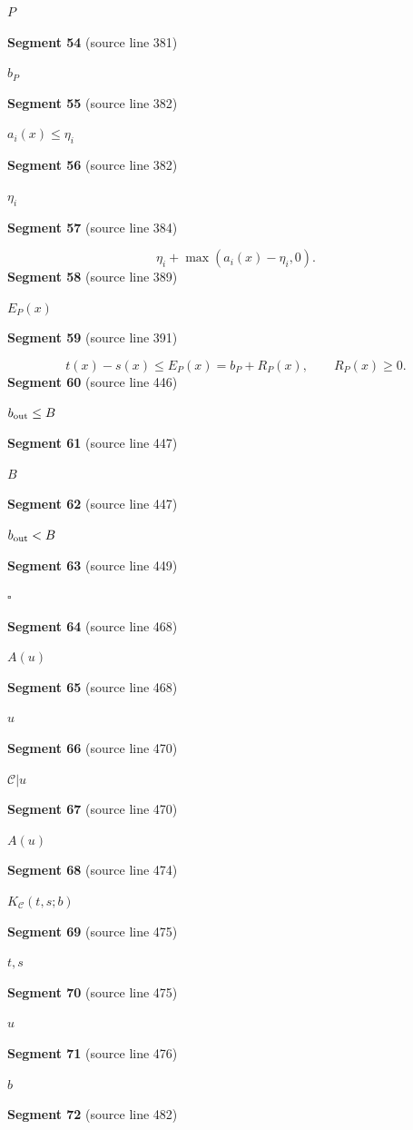 \documentclass[11pt]{article}
\begin{document}
\( P \)\par
\textbf{Segment 54} (source line 381)\par
\( b_P \)\par
\textbf{Segment 55} (source line 382)\par
\( a_i(x)\le\eta_i \)\par
\textbf{Segment 56} (source line 382)\par
\( \eta_i \)\par
\textbf{Segment 57} (source line 384)\par
\[
\eta_i+\max(a_i(x)-\eta_i,0).
\]
\textbf{Segment 58} (source line 389)\par
\( E_P(x) \)\par
\textbf{Segment 59} (source line 391)\par
\[
t(x)-s(x)\le E_P(x)=b_P+R_P(x),\qquad R_P(x)\ge0.
\tag{7}
\]
\textbf{Segment 60} (source line 446)\par
\( b_{\rm out}\le B \)\par
\textbf{Segment 61} (source line 447)\par
\( B \)\par
\textbf{Segment 62} (source line 447)\par
\( b_{\rm out}<B \)\par
\textbf{Segment 63} (source line 449)\par
\( \square \)\par
\textbf{Segment 64} (source line 468)\par
\( A(u) \)\par
\textbf{Segment 65} (source line 468)\par
\( u \)\par
\textbf{Segment 66} (source line 470)\par
\( \mathcal C|u \)\par
\textbf{Segment 67} (source line 470)\par
\( A(u) \)\par
\textbf{Segment 68} (source line 474)\par
\( K_{\mathcal C}(t,s;b) \)\par
\textbf{Segment 69} (source line 475)\par
\( t,s \)\par
\textbf{Segment 70} (source line 475)\par
\( u \)\par
\textbf{Segment 71} (source line 476)\par
\( b \)\par
\textbf{Segment 72} (source line 482)\par
\end{document}
